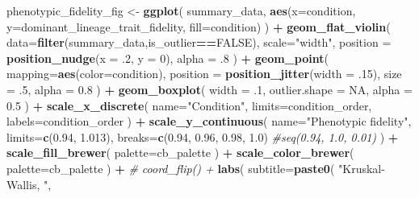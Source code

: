 \documentclass[]{book}
\newenvironment{Shaded}{\begin{snugshade}}{\end{snugshade}}
\newcommand{\CommentTok}[1]{\textcolor[rgb]{0.56,0.35,0.01}{\textit{#1}}}
\newcommand{\DataTypeTok}[1]{\textcolor[rgb]{0.13,0.29,0.53}{#1}}
\newcommand{\DecValTok}[1]{\textcolor[rgb]{0.00,0.00,0.81}{#1}}
\newcommand{\FloatTok}[1]{\textcolor[rgb]{0.00,0.00,0.81}{#1}}
\newcommand{\KeywordTok}[1]{\textcolor[rgb]{0.13,0.29,0.53}{\textbf{#1}}}
\newcommand{\NormalTok}[1]{#1}
\newcommand{\OperatorTok}[1]{\textcolor[rgb]{0.81,0.36,0.00}{\textbf{#1}}}
\newcommand{\OtherTok}[1]{\textcolor[rgb]{0.56,0.35,0.01}{#1}}
\newcommand{\StringTok}[1]{\textcolor[rgb]{0.31,0.60,0.02}{#1}}
\begin{document}
\begin{Shaded}
\begin{Highlighting}[]
{{{{\NormalTok{phenotypic_fidelity_fig <-}\StringTok{ }\KeywordTok{ggplot}\NormalTok{(}
\NormalTok{    summary_data,}
    \KeywordTok{aes}\NormalTok{(}\DataTypeTok{x=}\NormalTok{condition, }\DataTypeTok{y=}\NormalTok{dominant_lineage_trait_fidelity, }\DataTypeTok{fill=}\NormalTok{condition)}
\NormalTok{  ) }\OperatorTok{+}
\StringTok{  }\KeywordTok{geom_flat_violin}\NormalTok{(}
    \DataTypeTok{data=}\KeywordTok{filter}\NormalTok{(summary_data,is_outlier}\OperatorTok{==}\OtherTok{FALSE}\NormalTok{),}
    \DataTypeTok{scale=}\StringTok{"width"}\NormalTok{,}
    \DataTypeTok{position =} \KeywordTok{position_nudge}\NormalTok{(}\DataTypeTok{x =} \FloatTok{.2}\NormalTok{, }\DataTypeTok{y =} \DecValTok{0}\NormalTok{),}
    \DataTypeTok{alpha =} \FloatTok{.8}
\NormalTok{  ) }\OperatorTok{+}
\StringTok{  }\KeywordTok{geom_point}\NormalTok{(}
    \DataTypeTok{mapping=}\KeywordTok{aes}\NormalTok{(}\DataTypeTok{color=}\NormalTok{condition),}
    \DataTypeTok{position =} \KeywordTok{position_jitter}\NormalTok{(}\DataTypeTok{width =} \FloatTok{.15}\NormalTok{),}
    \DataTypeTok{size =} \FloatTok{.5}\NormalTok{,}
    \DataTypeTok{alpha =} \FloatTok{0.8}
\NormalTok{  ) }\OperatorTok{+}
\StringTok{  }\KeywordTok{geom_boxplot}\NormalTok{(}
    \DataTypeTok{width =} \FloatTok{.1}\NormalTok{,}
    \DataTypeTok{outlier.shape =} \OtherTok{NA}\NormalTok{,}
    \DataTypeTok{alpha =} \FloatTok{0.5}
\NormalTok{  ) }\OperatorTok{+}
\StringTok{  }\KeywordTok{scale_x_discrete}\NormalTok{(}
    \DataTypeTok{name=}\StringTok{"Condition"}\NormalTok{,}
    \DataTypeTok{limits=}\NormalTok{condition_order,}
    \DataTypeTok{labels=}\NormalTok{condition_order}
\NormalTok{  ) }\OperatorTok{+}
\StringTok{  }\KeywordTok{scale_y_continuous}\NormalTok{(}
    \DataTypeTok{name=}\StringTok{"Phenotypic fidelity"}\NormalTok{,}
    \DataTypeTok{limits=}\KeywordTok{c}\NormalTok{(}\FloatTok{0.94}\NormalTok{, }\FloatTok{1.013}\NormalTok{),}
    \DataTypeTok{breaks=}\KeywordTok{c}\NormalTok{(}\FloatTok{0.94}\NormalTok{, }\FloatTok{0.96}\NormalTok{, }\FloatTok{0.98}\NormalTok{, }\FloatTok{1.0}\NormalTok{) }\CommentTok{#seq(0.94, 1.0, 0.01)}
\NormalTok{  ) }\OperatorTok{+}
\StringTok{  }\KeywordTok{scale_fill_brewer}\NormalTok{(}
    \DataTypeTok{palette=}\NormalTok{cb_palette}
\NormalTok{  ) }\OperatorTok{+}
\StringTok{  }\KeywordTok{scale_color_brewer}\NormalTok{(}
    \DataTypeTok{palette=}\NormalTok{cb_palette}
\NormalTok{  ) }\OperatorTok{+}
\StringTok{  }\CommentTok{# coord_flip() +}
\StringTok{  }\KeywordTok{labs}\NormalTok{(}
    \DataTypeTok{subtitle=}\KeywordTok{paste0}\NormalTok{(}
      \StringTok{"Kruskal-Wallis, "}\NormalTok{,}
}}}}
\end{Highlighting}
\end{Shaded}
\end{document}
